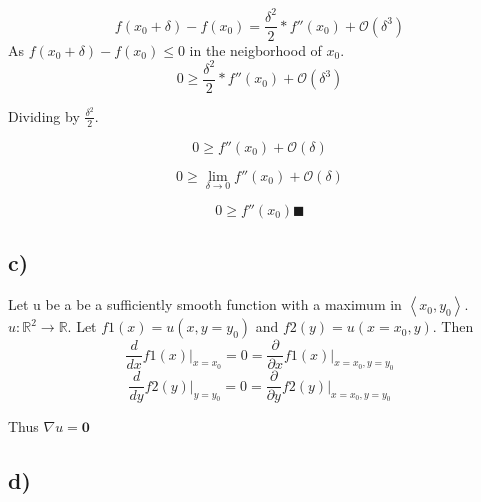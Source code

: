 \documentclass{article}
\begin{document}
\begin{multicols}{2}
\begin{equation*}
    f(x_{0}+\delta) - f(x_{0}) = \frac{\delta^2}{2}*f''(x_{0}) + \mathcal{O}(\delta^3)
\end{equation*}
 As $f(x_{0}+\delta) - f(x_{0}) \leq 0$ in the neigborhood of $x_{0}$.
\begin{equation*}
    0 \geq \frac{\delta^2}{2}*f''(x_{0}) + \mathcal{O}(\delta^3)
\end{equation*}

Dividing by $\frac{\delta^2}{2}$.

\begin{equation*}
    0 \geq f''(x_{0}) + \mathcal{O}(\delta)
\end{equation*}

\begin{equation*}
    0 \geq \lim_{\delta \to 0} f''(x_{0}) + \mathcal{O}(\delta)
\end{equation*}

\begin{equation*}
    0 \geq f''(x_{0}) \blacksquare
\end{equation*}

\subsection{c)}
Let u be a be a sufficiently smooth function with a maximum in $ \left<x_{0}, y_{0}\right> $.$ u: \mathbb{R}^{2} \to \mathbb{R} $.
Let $f1(x) = u(x,y=y_{0})$ and $f2(y) = u(x=x_{0},y)$. Then
\begin{equation*}
    \frac{d}{dx}f1(x)\bigg|_{x=x_{0}} = 0 = \frac{\partial}{\partial x}f1(x)\bigg|_{x=x_{0},y=y_{0}}
\end{equation*}{}
\begin{equation*}
    \frac{d}{dy}f2(y)\bigg|_{y=y_{0}} = 0 = \frac{\partial}{\partial y}f2(y)\bigg|_{x=x_{0},y=y_{0}}
\end{equation*}{}

Thus $\nabla u = \mathbf{0}$
\end{multicols}

\subsection{d)}
\end{document}
